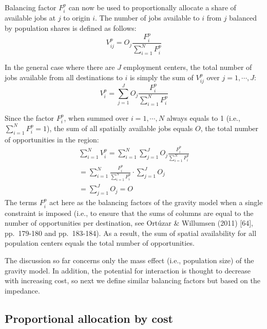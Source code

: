 \documentclass[10pt,letterpaper]{article}
\begin{document}
Balancing factor \(F^p_{i}\) can now be used to proportionally allocate
a share of available jobs at \(j\) to origin \(i\). The number of jobs
available to \(i\) from \(j\) balanced by population shares is defined
as follows: \[
V^p_{ij} = O_j\frac{F^p_{i}}{\sum_{i=1}^N F^p_{i}}
\]

In the general case where there are \(J\) employment centers, the total
number of jobs available from all destinations to \(i\) is simply the
sum of \(V^p_{ij}\) over \(j=1,\cdots, J\): \[
V^p_{i} = \sum_{j=1}^J O_j\frac{F^p_{i}}{\sum_{i=1}^N F^p_{i}}
\]

Since the factor \(F^p_{i}\), when summed over \(i=1,\cdots,N\) always
equals to 1 (i.e., \(\sum_{i=1}^{N} F^p_{i} = 1\)), the sum of all
spatially available jobs equals \(O\), the total number of opportunities
in the region: \[
\begin{array}{l}
\sum_{i=1}^N V^p_i =\sum_{i=1}^N\sum_{j=1}^JO_j\frac{F^p_{i}}{\sum_{i=1}^N F^p_{i}}\\
=\sum_{i=1}^N \frac{F^p_{i}}{\sum_{i=1}^N F^p_{i}}\cdot\sum_{j=1}^JO_j\\
=\sum_{j=1}^J O_j = O
\end{array}
\] The terms \(F^p_{i}\) act here as the balancing factors of the
gravity model when a single constraint is imposed (i.e., to ensure that
the sums of columns are equal to the number of opportunities per
destination, see Ortúzar \& Willumsen (2011) {[}64{]}, pp.~179-180 and
pp.~183-184). As a result, the sum of spatial availability for all
population centers equals the total number of opportunities.

The discussion so far concerns only the mass effect (i.e., population
size) of the gravity model. In addition, the potential for interaction
is thought to decrease with increasing cost, so next we define similar
balancing factors but based on the impedance.

\hypertarget{proportional-allocation-by-cost}{%
\subsection{Proportional allocation by
cost}\label{proportional-allocation-by-cost}}
\end{document}
